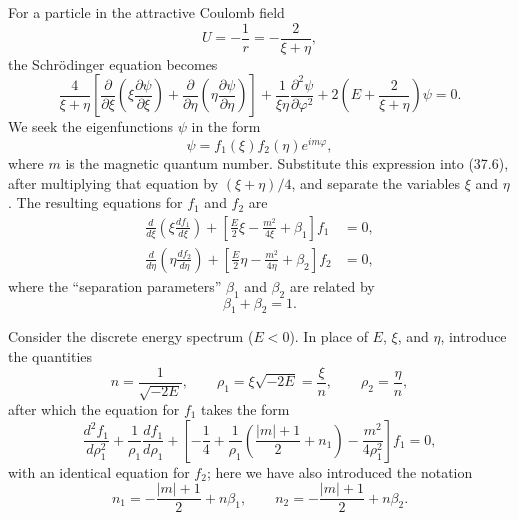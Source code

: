 For a particle in the attractive Coulomb field
\[
  U=-\frac1r=-\frac2{\xi+\eta},
\]
the Schrödinger equation becomes
\begin{equation}
  \frac4{\xi+\eta}\left[
    \frac\partial{\partial\xi}\left(\xi\frac{\partial\psi}{\partial\xi}\right)
   +\frac\partial{\partial\eta}\left(\eta\frac{\partial\psi}{\partial\eta}\right)
  \right]
  +\frac1{\xi\eta}\frac{\partial^2\psi}{\partial\varphi^2}
  +2\left(E+\frac2{\xi+\eta}\right)\psi=0.
  \tag{37.6}
\end{equation}
We seek the eigenfunctions $\psi$ in the form
\begin{equation}
  \psi=f_1(\xi)f_2(\eta)e^{im\varphi},
  \tag{37.7}
\end{equation}
where $m$ is the magnetic quantum number. Substitute this expression into
(37.6), after multiplying that equation by $(\xi+\eta)/4$, and separate the
variables $\xi$ and $\eta$. The resulting equations for $f_1$ and $f_2$ are
\begin{equation}
 \begin{aligned}
  \frac d{d\xi}\left(\xi\frac{df_1}{d\xi}\right)
  +\left[\frac E2\xi-\frac{m^2}{4\xi}+\beta_1\right]f_1&=0,\\
  \frac d{d\eta}\left(\eta\frac{df_2}{d\eta}\right)
  +\left[\frac E2\eta-\frac{m^2}{4\eta}+\beta_2\right]f_2&=0,
 \end{aligned}
 \tag{37.8}
\end{equation}
where the ``separation parameters'' $\beta_1$ and $\beta_2$ are related by
\begin{equation}
  \beta_1+\beta_2=1.
  \tag{37.9}
\end{equation}

Consider the discrete energy spectrum ($E<0$). In place of $E$, $\xi$, and
$\eta$, introduce the quantities
\begin{equation}
  n=\frac1{\sqrt{-2E}},\qquad
  \rho_1=\xi\sqrt{-2E}=\frac\xi n,\qquad
  \rho_2=\frac\eta n,
  \tag{37.10}
\end{equation}
after which the equation for $f_1$ takes the form
\begin{equation}
  \frac{d^2f_1}{d\rho_1^2}+\frac1{\rho_1}\frac{df_1}{d\rho_1}
  +\left[-\frac14+\frac1{\rho_1}
    \left(\frac{|m|+1}{2}+n_1\right)-\frac{m^2}{4\rho_1^2}\right]f_1=0,
  \tag{37.11}
\end{equation}
with an identical equation for $f_2$; here we have also introduced the
notation
\begin{equation}
  n_1=-\frac{|m|+1}{2}+n\beta_1,\qquad
  n_2=-\frac{|m|+1}{2}+n\beta_2.
  \tag{37.12}
\end{equation}

